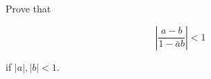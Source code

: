 Prove that

$$|\frac{a-b}{1-\bar{a}b}|<1$$

if $|a|,|b|<1$.\\

\begin{solution}\renewcommand{\qedsymbol}{}\ \\

    

\end{solution}